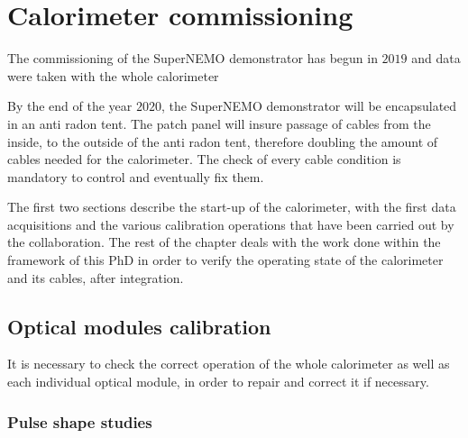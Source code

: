 \chapter{Calorimeter commissioning}
\label{ch:commissioning}


The commissioning of the SuperNEMO demonstrator has begun in $2019$ and data were taken with the whole calorimeter

By the end of the year $2020$, the SuperNEMO demonstrator will be encapsulated in an anti radon tent.
The patch panel will insure passage of cables from the inside, to the outside of the anti radon tent, therefore doubling the amount of cables needed for the calorimeter.
The check of every cable condition is mandatory to control and eventually fix them.

The first two sections describe the start-up of the calorimeter, with the first data acquisitions and the various calibration operations that have been carried out by the collaboration.
The rest of the chapter deals with the work done within the framework of this PhD in order to verify the operating state of the calorimeter and its cables, after integration.


\section{Optical modules calibration}

It is necessary to check the correct operation of the whole calorimeter as well as each individual optical module, in order to repair and correct it if necessary.

\subsection{Pulse shape studies}
\label{subsec:SN_pulse_shape}

